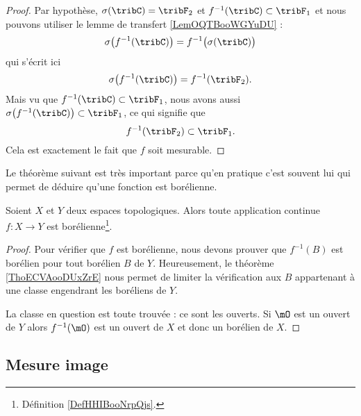 \begin{proof}
    Par hypothèse, \( \sigma(\tribC)=\tribF_2\) et \( f^{-1}(\tribC)\subset \tribF_1\) et nous pouvons utiliser le lemme de transfert \ref{LemOQTBooWGYuDU} :
    \begin{equation}
        \sigma\big( f^{-1}(\tribC) \big)=f^{-1}\big( \sigma(\tribC) \big)
    \end{equation}
    qui s'écrit ici
    \begin{equation}
        \sigma\big( f^{-1}(\tribC) \big)=f^{-1}(\tribF_2).
    \end{equation}
    Mais vu que \( f^{-1}(\tribC)\subset \tribF_1\), nous avons aussi \( \sigma\big( f^{-1}(\tribC) \big)\subset \tribF_1\), ce qui signifie que
    \begin{equation}
        f^{-1}(\tribF_2)\subset \tribF_1.
    \end{equation}
    Cela est exactement le fait que \( f\) soit mesurable.
\end{proof}

Le théorème suivant est très important parce qu'en pratique c'est souvent lui qui permet de déduire qu'une fonction est borélienne.
\begin{theorem}     \label{ThoJDOKooKaaiJh}
    Soient \( X\) et \( Y\) deux espaces topologiques. Alors toute application continue \( f\colon X\to Y\) est borélienne\footnote{Définition \ref{DefHHIBooNrpQjs}.}.
\end{theorem}

\begin{proof}
    Pour vérifier que \( f\) est borélienne, nous devons prouver que \( f^{-1}(B)\) est borélien pour tout borélien \( B\) de \( Y\). Heureusement, le théorème \ref{ThoECVAooDUxZrE} nous permet de limiter la vérification aux \( B\) appartenant à une classe engendrant les boréliens de \( Y\).

    La classe en question est toute trouvée : ce sont les ouverts. Si \( \mO\) est un ouvert de \( Y\) alors \( f^{-1}(\mO)\) est un ouvert de \( X\) et donc un borélien de \( X\).
\end{proof}

\subsection{Mesure image}

